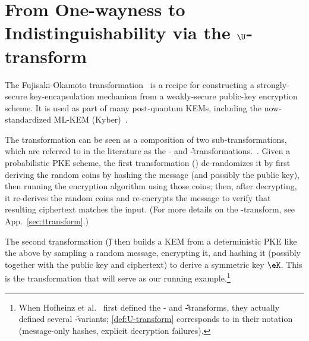 \section{From One-wayness to Indistinguishability via the $\U$-transform}\label{sec:utransform}
  The Fujisaki-Okamoto transformation~\cite{C:FujOka99} is a recipe for
    constructing a strongly-secure key-encapsulation mechanism from a
    weakly-secure public-key encryption scheme. It is used as part of many
    post-quantum KEMs, including the now-standardized ML-KEM (Kyber)~\cite{FIPS203}. 

  The transformation can be seen as a composition of two sub-transformations, 
    which are referred to in the literature as the \T- and
    \U-transformations.~\cite{TCC:HofHovKil17}.
    Given a probabilistic PKE scheme, the first transformation
    (\T) de-randomizes it by first deriving the random coins by hashing
    the message (and possibly the public key), then running the encryption
    algorithm using those coins; then, after decrypting, it re-derives the
    random coins and re-encrypts the message to verify that resulting
    ciphertext matches the input. (For more details on the \T-transform, see
    App.~\ref{sec:ttransform}.)

  The second transformation (\U) then 
    builds a KEM from a deterministic PKE like the above by sampling a random
    message, encrypting it, and hashing it 
    (possibly together with the public key and ciphertext) to derive a
    symmetric key $\eK$. This is the transformation that will serve as our
    running example.\footnote{
      When Hofheinz et al.~\cite{TCC:HofHovKil17} first defined
      the \T- and \U-transforms, they actually defined several \U-variants;
      \cref{def:U-transform} corresponds to
      \UExpMess in their notation (message-only hashes, explicit decryption failures).
    }

